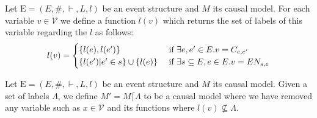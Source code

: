 \begin{definition}
    Let $\mathrm{E} = (E,\#,\vdash,L,l)$ be an event structure and $M$ its
    causal model.
    For each variable $v \in \mathcal{V}$ we define a function $l(v)$ which
    returns the set of labels of this variable regarding the $l$ as follows:
    $$
        l(v) = \begin{cases}
            \{l(e),l(e')\}                     & \text{ if } \exists e,e' \in E. v = C_{e,e'} \\
            \{l(e')| e' \in s \} \cup \{l(e)\} & \text{ if }
            \exists s \subseteq E, e \in E. v = EN_{s,e}
        \end{cases}
    $$
\end{definition}

\begin{definition}
    Let $\mathrm{E} = (E,\#,\vdash,L,l)$ be an event structure and $M$ its
    causal model.
    Given a set of labels $\Lambda$, we define $M' = M\lceil \Lambda$ to be
    a causal model where we have removed any variable such as
    $x \in \mathcal{V}$ and its functions where $l(v) \not \subseteq \Lambda$.
\end{definition}


